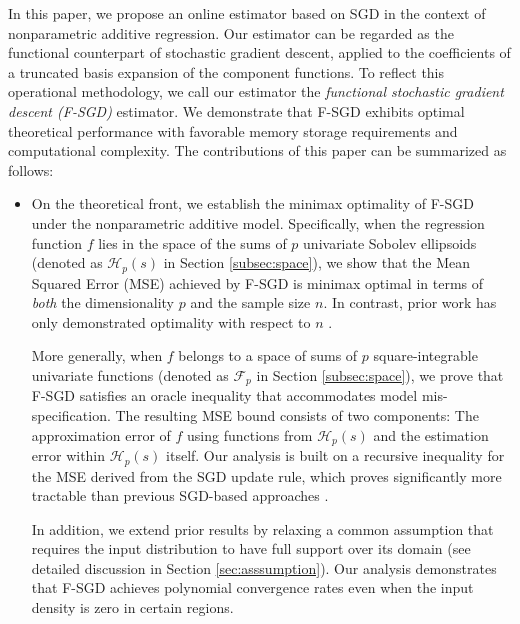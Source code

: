 In this paper, we propose an online estimator based on SGD in the context of nonparametric additive regression.  Our estimator can be regarded as the functional counterpart of  stochastic gradient descent, applied to the coefficients of a truncated basis expansion of the component functions. To reflect this operational methodology, we call our estimator the \textit{functional stochastic gradient descent (F-SGD)} estimator.
We demonstrate that F-SGD exhibits optimal theoretical performance with favorable memory storage requirements and  computational complexity. The contributions of this paper can be summarized as follows:
\begin{itemize}

\item On the theoretical front, we establish the minimax optimality of F-SGD under the nonparametric additive model. Specifically, when the regression function $f$  lies in the space of the sums of $p$ univariate Sobolev ellipsoids (denoted as $\mathcal{H}_p(s)$ in Section \ref{subsec:space}), we show that the Mean Squared Error (MSE) achieved by F-SGD is minimax optimal in terms of \emph{both} the dimensionality $p$ and the sample size $n$. In contrast, prior work has only demonstrated optimality with respect to $n$ \citep{zhang2022sieve,4406a3ce-1e59-3ed8-8c25-9f7d75b81f14, xue2022dynamic, doi:10.1080/01621459.2023.2182213, quan2024optimal}. 

More generally, when $f$ belongs to a space of sums of $p$ square-integrable univariate functions (denoted as $\mathcal{F}_p$ in Section \ref{subsec:space}), we prove that F-SGD satisfies an oracle inequality that accommodates model mis-specification. The resulting MSE bound consists of two components: The approximation error of $f$ using functions from $\mathcal{H}_p(s)$ and the estimation error within $\mathcal{H}_p(s)$ itself. Our analysis is built on a recursive inequality for the MSE derived from the SGD update rule, which proves significantly more tractable than previous SGD-based approaches \citep{zhang2022sieve,4406a3ce-1e59-3ed8-8c25-9f7d75b81f14}. 

In addition, we extend prior results by relaxing a common assumption that requires the input distribution to have full support over its domain (see detailed discussion in Section \ref{sec:asssumption}). Our analysis demonstrates that F-SGD achieves polynomial convergence rates even when the input density is zero in certain regions.


\end{itemize}
